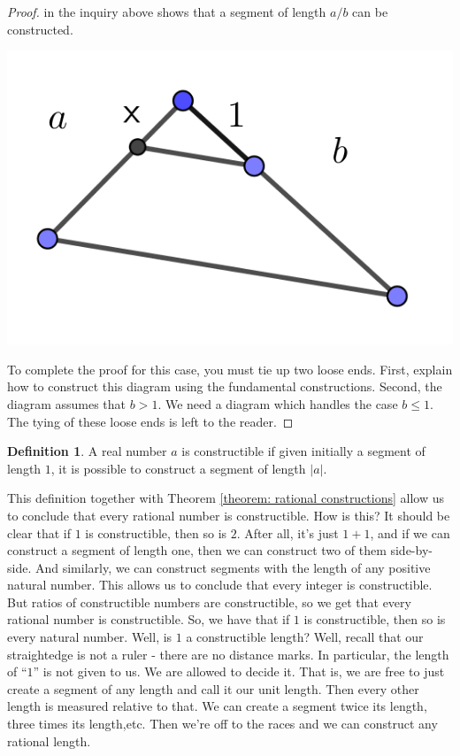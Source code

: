 \documentclass[11pt]{article}
\theoremstyle{definition}
\newtheorem{definition}[theorem]{Definition}
\begin{document}
\begin{proof}
  in the inquiry above shows that a segment of length $a/b$ can be constructed.
  \begin{center}
    \includegraphics[scale=.1]{Images/a_over_b.png}
  \end{center}
  To complete the proof for this case, you must tie up two loose ends. First, explain how to construct this diagram using the fundamental
  constructions. Second, the diagram assumes that $b>1$. We need a diagram which handles the case $b \leq 1$. The tying of these loose ends
  is left to the reader.
\end{proof}

\begin{definition}
  A real number $a$ is constructible if given initially a segment of length $1$, it is possible to construct a segment of length $|a|$.
\end{definition}

This definition together with Theorem \ref{theorem: rational constructions} allow us to conclude that every rational number is constructible. How is this?
It should be clear that if $1$ is constructible, then so is $2$. After all, it's just $1+1$, and if we can construct a segment of length one, then
we can construct two of them side-by-side. And similarly, we can construct segments with the length of any positive natural number. This allows us
to conclude that every integer is constructible. But ratios of constructible numbers are constructible, so we get that every rational number is 
constructible. So, we have that if $1$ is constructible, then so is every natural number. Well, is $1$ a constructible length? Well, recall that our
straightedge is not a ruler - there are no distance marks. In particular, the length of ``$1$'' is not given to us. We are allowed to decide it. That is,
we are free to just create a segment of any length and call it our unit length. Then every other length is measured relative to that. We can create
a segment twice its length, three times its length,etc. Then we're off to the races and we can construct any rational length.
\end{document}
